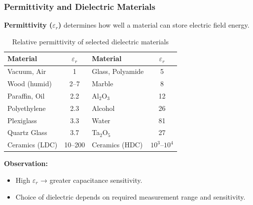 \begin{frame}
	\frametitle{Permittivity and Dielectric Materials}
    \textbf{Permittivity ($\varepsilon_r$)} determines how well a material can store electric field energy.
    \begin{table}
        \small
        \centering
        \begin{tabular}{l c | l c}
            \toprule
            \textbf{Material} & $\varepsilon_r$ & \textbf{Material} & $\varepsilon_r$ \\
            \midrule
            Vacuum, Air       & 1              & Glass, Polyamide  & 5 \\
            Wood (humid)      & 2--7           & Marble            & 8 \\
            Paraffin, Oil     & 2.2            & Al$_2$O$_3$       & 12 \\
            Polyethylene      & 2.3            & Alcohol           & 26 \\
            Plexiglass        & 3.3            & Water             & 81 \\
            Quartz Glass      & 3.7            & Ta$_2$O$_5$       & 27 \\
            Ceramics (LDC)    & 10--200        & Ceramics (HDC)    & $10^3$--$10^4$ \\
            \bottomrule
        \end{tabular}
        \caption{Relative permittivity of selected dielectric materials}\label{tab:relative_permittivity}
    \end{table}
    \textbf{Observation:}
    \begin{itemize}
        \item High $\varepsilon_r$ → greater capacitance sensitivity.
        \item Choice of dielectric depends on required measurement range and sensitivity.
    \end{itemize}
\end{frame}

